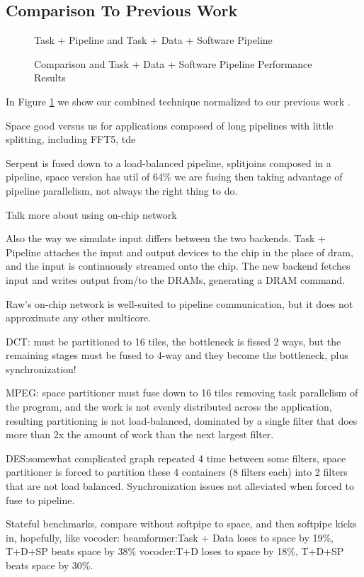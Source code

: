 \subsection{Comparison To Previous Work}

\begin{figure}[t]
\centering
{}
\caption{Task + Pipeline and Task + Data + Software Pipeline
\protect\label{fig:vs-space}}
\end{figure}

\begin{figure*}[t]
\centering
{}
\caption{Comparison and Task + Data + Software Pipeline Performance Results
\protect\label{fig:thruput}}
\end{figure*}
In Figure \ref{fig:vs-space} we show our combined technique normalized
to our previous work \cite{streamit-asplos}.  

Space good versus us for applications composed of long pipelines with little
splitting, including FFT5, tde

Serpent is fused down to a load-balanced pipeline, splitjoins
composed in a pipeline, space version has util of 64\% we are fusing
then taking advantage of pipeline parallelism, not always the right
thing to do.

Talk more about using on-chip network

Also the way we simulate input differs between the two backends.  Task
+ Pipeline attaches the input and output devices to the chip in the
place of dram, and the input is continuously streamed onto the chip.
The new backend fetches input and writes output from/to the DRAMs,
generating a DRAM command.

Raw's on-chip network is well-suited to pipeline communication, but it
does not approximate any other multicore.

DCT: must be partitioned to 16 tiles, the bottleneck is fissed 2 ways,
but the remaining stages must be fused to 4-way and they become the
bottleneck, plus synchronization!

MPEG: space partitioner must fuse down to 16 tiles removing task
parallelism of the program, and the work is not evenly distributed
across the application, resulting partitioning is not load-balanced,
dominated by a single filter that does more than 2x the amount of work
than the next largest filter.

DES:somewhat complicated graph repeated 4 time between some filters,
space partitioner is forced to partition these 4 containers (8 filters
each) into 2 filters that are not load balanced.  Synchronization
issues not alleviated when forced to fuse to pipeline.

Stateful benchmarks, compare without softpipe to space, and
then softpipe kicks in, hopefully, like 
vocoder:
beamformer:Task + Data loses to space by 19\%, T+D+SP beats space by
38\%
vocoder:T+D loses to space by 18\%, T+D+SP beats space by 30\%.

